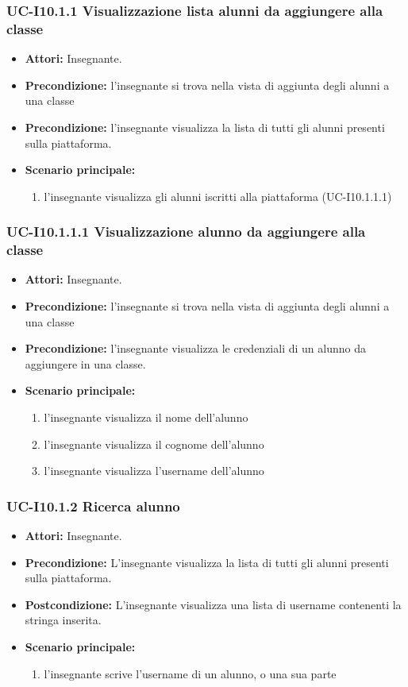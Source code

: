 \subsubsection{UC-I10.1.1 Visualizzazione lista alunni da aggiungere alla classe}
\begin{itemize}
	\item \textbf{Attori:} Insegnante.
	\item \textbf{Precondizione:} l'insegnante si trova nella vista di aggiunta degli alunni a una classe
	\item \textbf{Precondizione:} l'insegnante visualizza la lista di tutti gli alunni presenti sulla piattaforma.
	\item \textbf{Scenario principale:}
	\begin{enumerate}
		\item l'insegnante visualizza gli alunni iscritti alla piattaforma (UC-I10.1.1.1)
	\end{enumerate}
\end{itemize}

\subsubsection{UC-I10.1.1.1 Visualizzazione alunno da aggiungere alla classe}
\begin{itemize}
	\item \textbf{Attori:} Insegnante.
	\item \textbf{Precondizione:} l'insegnante si trova nella vista di aggiunta degli alunni a una classe
	\item \textbf{Precondizione:} l'insegnante visualizza le credenziali di un alunno da aggiungere in una classe.
	\item \textbf{Scenario principale:}
	\begin{enumerate}
		\item l'insegnante visualizza il nome dell'alunno
		\item l'insegnante visualizza il cognome dell'alunno
		\item l'insegnante visualizza l'username dell'alunno
	\end{enumerate}
\end{itemize}

\subsubsection{UC-I10.1.2 Ricerca alunno}
\begin{itemize}
	\item \textbf{Attori:} Insegnante.
	\item \textbf{Precondizione:} L'insegnante visualizza la lista di tutti gli alunni presenti sulla piattaforma.
	\item \textbf{Postcondizione:} L'insegnante visualizza una lista di username contenenti la stringa inserita.
	\item \textbf{Scenario principale:}
	\begin{enumerate}
		\item l'insegnante scrive l'username di un alunno, o una sua parte
	\end{enumerate}
\end{itemize}

